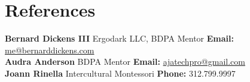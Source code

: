 \documentclass[letterpaper,11pt]{article}
\makeatletter
\newcommand{\resumeOrganizationHeading}[4]{
  \vspace{-2pt}\item
    \begin{tabular*}{0.97\textwidth}[t]{l@{\extracolsep{\fill}}r}
      \textbf{#1} & \textit{\small #2} \\
      \textit{\small#3}
    \end{tabular*}\vspace{-7pt}
}
\newcommand{\resumeSubHeadingListStart}{\begin{itemize}[leftmargin=0.15in, label={}]}
\newcommand{\resumeSubHeadingListEnd}{\end{itemize}}
\makeatother
\begin{document}




    
    




    
    








\section{References}
  \vspace{2pt}
  \resumeSubHeadingListStart
    \small{\item{
        \textbf{Bernard Dickens III}{ Ergodark LLC, BDPA Mentor \textbf{Email:} \href{mailto:me@bernarddickens.com}{me@bernarddickens.com}} \\ \vspace{3pt}
        \textbf{Audra Anderson}{ BDPA Mentor \textbf{Email:} \href{mailto:ajatechpro@gmail.com}{ajatechpro@gmail.com}} \\ \vspace{3pt}
        \textbf{Joann Rinella}{ Intercultural Montessori \textbf{Phone:} 312.799.9997 }
    }}
  \resumeSubHeadingListEnd

\end{document}
